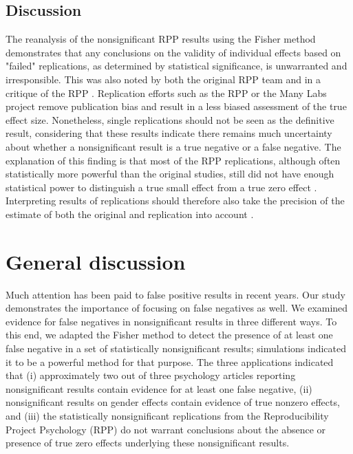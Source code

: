 \documentclass{article}
\begin{document}
\subsection*{Discussion}

The reanalysis of the nonsignificant RPP results using the Fisher method demonstrates that any conclusions on the validity of individual effects based on "failed" replications, as determined by statistical significance, is unwarranted and irresponsible. This was also noted by both the original RPP team \cite{Open_Science_Collaboration2015-zs,Anderson2016-bv} and in a critique of the RPP \cite{Gilbert2016-mi}. Replication efforts such as the RPP or the Many Labs project remove publication bias and result in a less biased assessment of the true effect size. Nonetheless, single replications should not be seen as the definitive result, considering that these results indicate there remains much uncertainty about whether a nonsignificant result is a true negative or a false negative. The explanation of this finding is that most of the RPP replications, although often statistically more powerful than the original studies, still did not have enough statistical power to distinguish a true small effect from a true zero effect \cite{Maxwell2015-yb}. Interpreting results of replications should therefore also take the precision of the estimate of both the original and replication into account \cite{Cumming2014-fi}.

\section*{General discussion}

Much attention has been paid to false positive results in recent years. Our study demonstrates the importance of focusing on false negatives as well. We examined evidence for false negatives in nonsignificant results in three different ways. To this end, we adapted the Fisher method to detect the presence of at least one false negative in a set of statistically nonsignificant results; simulations indicated it to be a powerful method for that purpose. The three applications indicated that (i) approximately two out of three psychology articles reporting nonsignificant results contain evidence for at least one false negative, (ii) nonsignificant results on gender effects contain evidence of true nonzero effects, and (iii) the statistically nonsignificant replications from the Reproducibility Project Psychology (RPP) do not warrant conclusions about the absence or presence of true zero effects underlying these nonsignificant results.
\end{document}
